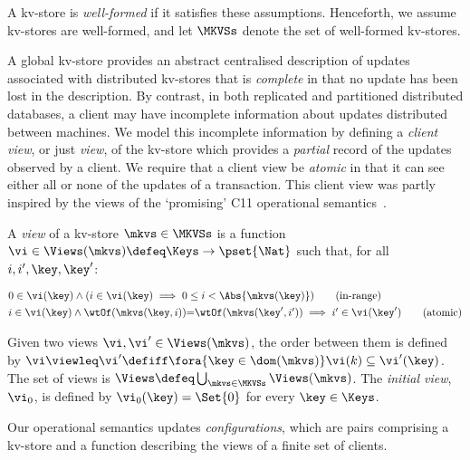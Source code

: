\noindent A kv-store is
\emph{well-formed} if it satisfies these assumptions.
Henceforth, we assume kv-stores are well-formed,
and let \(\MKVSs\) denote the set of well-formed kv-stores.

A global kv-store provides an abstract centralised description of
updates associated with distributed kv-stores that is \emph{complete} in 
that no update has been lost in the description. By contrast, in
both replicated and partitioned distributed databases, a client may
have incomplete information about updates distributed between
machines.  We model this incomplete information by
defining a \emph{client view}, or just \emph{view}, of the kv-store
which provides a \emph{partial} record of the updates observed by a
client. 
We require that a client view be \emph{atomic} in that it can
see either all or none of the updates of a transaction.
This client view was partly inspired 
by the views of the `promising' C11 operational semantics~\cite{promises}.

\SpaceAboveDef
\begin{definition}[Views]
\label{def:view}
\label{def:cuts}
\label{def:views}
A \emph{view} of a kv-store \(\mkvs \in \MKVSs\) is a function
\(\vi \in \Views(\mkvs) \defeq \Keys \to\pset{\Nat}\) such that, for all \(i, i', \key, \key'\):

\SpaceAboveMath
\begin{align*}
    & 
    0 \in \vi(\key) 
    \land (i \in \vi(\key) \implies 0 \leq i < \Abs{ \mkvs(\key) }) 
    \tag{in-range}
    \label{eq:view.wf}\\
    & 
    \begin{array}{@{}l@{}}
	i \in \vi(\key)  
  	\land \wtOf(\mkvs(\key, i)) {=} \wtOf(\mkvs(\key', i'))  
  	\implies i' \in \vi(\key')
    \end{array}
	\tag{atomic}
	\label{eq:view.atomic}
\end{align*}
\SpaceBelowMath

Given two views \(\vi, \vi' \in \Views(\mkvs)\), 
the order between them is defined by \(\vi \viewleq \vi' \defiff \fora{\key \in \dom(\mkvs)} \vi(k) \subseteq \vi'(\key)\).
The set of views is \(\Views \defeq \bigcup_{\mkvs \in \MKVSs} \Views(\mkvs)\).
The \emph{initial view}, \(\vi_{0}\),  is defined by
\(\vi_{0}(\key) = \Set{0}\) for every \(\key \in \Keys\). 
\end{definition}
\SpaceBelowDef

Our operational semantics updates \emph{configurations},  which are pairs
comprising a kv-store and a function describing the
views of a finite set of clients. 

